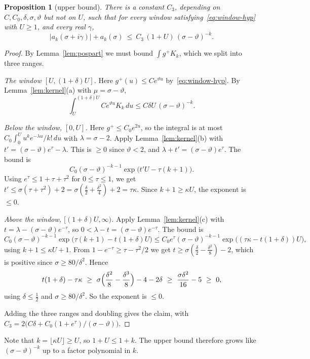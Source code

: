 \documentclass[11pt]{amsart}
\newtheorem{proposition}[theorem]{Proposition}
\theoremstyle{definition}
\theoremstyle{remark}
\begin{document}
\begin{proposition}[upper bound]\label{prop:upper}
There is a constant $C_3$, depending on $C,C_0,\delta,\sigma,\vartheta$ but not on $U$, such that for every window satisfying~\eqref{eq:window-hyp} with $U\ge1$, and every real $\gamma$,
\[
|a_k(\sigma+i\gamma)|+a_k(\sigma)\ \le\ C_3\,(1+U)\,(\sigma-\vartheta)^{-k}.
\]
\end{proposition}

\begin{proof}
By Lemma~\ref{lem:pospart} we must bound $\int g^+K_k$, which we split into three ranges.

\emph{The window $[U,(1+\delta)U]$.} Here $g^+(u)\le Ce^{\vartheta u}$ by~\eqref{eq:window-hyp}. By Lemma~\ref{lem:kernel}(a) with $\mu=\sigma-\vartheta$,
\[
\int_U^{(1+\delta)U}Ce^{\vartheta u}K_k\,du\le C\delta U\,(\sigma-\vartheta)^{-k}.
\]

\emph{Below the window, $[0,U]$.} Here $g^+\le C_0e^{2u}$, so the integral is at most $C_0\int_0^Uu^ke^{-\lambda u}/k!\,du$ with $\lambda=\sigma-2$. Apply Lemma~\ref{lem:kernel}(b) with $t'=(\sigma-\vartheta)e^{\tau}-\lambda$. This is $\ge0$ since $\vartheta<2$, and $\lambda+t'=(\sigma-\vartheta)e^{\tau}$. The bound is
\[
C_0(\sigma-\vartheta)^{-k-1}\exp\bigl(t'U-\tau(k+1)\bigr).
\]
Using $e^\tau\le1+\tau+\tau^2$ for $0\le\tau\le1$, we get $t'\le\sigma(\tau+\tau^2)+2=\sigma(\tfrac\delta2+\tfrac{\delta^2}4)+2=\tau\kappa$. Since $k+1\ge\kappa U$, the exponent is $\le0$.

\emph{Above the window, $[(1+\delta)U,\infty)$.} Apply Lemma~\ref{lem:kernel}(c) with $t=\lambda-(\sigma-\vartheta)e^{-\tau}$, so $0<\lambda-t=(\sigma-\vartheta)e^{-\tau}$. The bound is
\[
C_0(\sigma-\vartheta)^{-k-1}\exp\bigl(\tau(k+1)-t(1+\delta)U\bigr)\le C_0e^{\tau}(\sigma-\vartheta)^{-k-1}\exp\bigl((\tau\kappa-t(1+\delta))U\bigr),
\]
using $k+1\le\kappa U+1$. From $1-e^{-\tau}\ge\tau-\tau^2/2$ we get $t\ge\sigma(\tfrac\delta2-\tfrac{\delta^2}8)-2$, which is positive since $\sigma\geq 80/\delta^2$. Hence
\[
t(1+\delta)-\tau\kappa\ \ge\ \sigma\Bigl(\frac{\delta^2}8-\frac{\delta^3}8\Bigr)-4-2\delta\ \ge\ \frac{\sigma\delta^2}{16}-5\ \ge\ 0,
\]
using $\delta\le\tfrac12$ and $\sigma\ge80/\delta^2$. So the exponent is $\le0$.

Adding the three ranges and doubling gives the claim, with $C_3=2\bigl(C\delta+C_0(1+e^{\tau})/(\sigma-\vartheta)\bigr)$.
\end{proof}

Note that $k=\lfloor\kappa U\rfloor\ge U$, so $1+U\le1+k$. The upper bound therefore grows like $(\sigma-\vartheta)^{-k}$ up to a factor polynomial in $k$.
\end{document}
